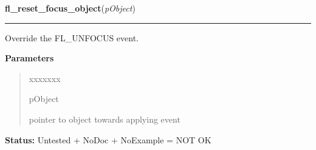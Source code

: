 \hspace{.8\funcindent}\begin{boxedminipage}{\funcwidth}

    \raggedright \textbf{fl\_reset\_focus\_object}(\textit{pObject})

    \vspace{-1.5ex}

    \rule{\textwidth}{0.5\fboxrule}
\setlength{\parskip}{2ex}
    Override the FL\_UNFOCUS event.

\setlength{\parskip}{1ex}
      \textbf{Parameters}
      \vspace{-1ex}

      \begin{quote}
        \begin{Ventry}{xxxxxxx}

          \item[pObject]

          pointer to object towards applying event

        \end{Ventry}

      \end{quote}

\textbf{Status:} Untested + NoDoc + NoExample = NOT OK



    \end{boxedminipage}

    \label{xformslib:library:fl_set_form_atclose}

    \vspace{0.5ex}

